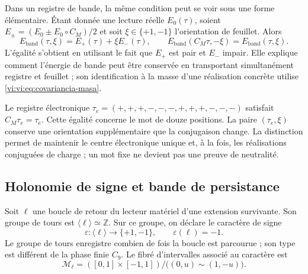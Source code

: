 Dans un registre de bande, la même condition peut se voir sous une forme
élémentaire. Étant donnée une lecture réelle $E_0(\tau)$, soient
$E_\pm=(E_0\pm E_0\circ C_M)/2$ et soit $\xi\in\{+1,-1\}$
l’orientation de feuillet. Alors
\begin{equation}
 E_{\mathrm{band}}(\tau,\xi)=E_+(\tau)+\xi E_-(\tau),\qquad
 E_{\mathrm{band}}(C_M\tau,-\xi)=E_{\mathrm{band}}(\tau,\xi).
 \label{vi:vi:eq:banda-paridad}
\end{equation}
L’égalité s’obtient en utilisant le fait que $E_+$ est pair et $E_-$ impair.
Elle explique comment l’énergie de bande peut être conservée en transportant
simultanément registre et feuillet ; son identification à la masse d’une
réalisation concrète utilise \eqref{vi:vi:eq:covariancia-masa}.

Le registre électronique
$\tau_e=(+,+,+,-,-,-,+,+,+,-,-,-)$ satisfait $C_M\tau_e=\tau_e$.
Cette égalité concerne le mot de douze positions. La paire
$(\tau_e,\xi)$ conserve une orientation supplémentaire que la
conjugaison change. La distinction permet de maintenir le centre
électronique unique et, à la fois, les réalisations conjuguées de charge ;
un mot fixe ne devient pas une preuve de neutralité.

\subsection{Holonomie de signe et bande de persistance}
\label{vi:vi:subsec:mobius}

Soit $\ell$ une boucle de retour du lecteur matériel d’une extension
survivante. Son groupe de tours est $\langle\ell\rangle\simeq
\mathbb Z$. Sur ce groupe, on déclare le caractère de signe
\begin{equation}
 \varepsilon:\langle\ell\rangle\longrightarrow\{+1,-1\},
 \qquad \varepsilon(\ell)=-1.
 \label{vi:vi:eq:holonomia-signo}
\end{equation}
Le groupe de tours enregistre combien de fois la boucle est parcourue ; son
type est différent de la phase finie $C_9$. Le fibré d’intervalles
associé au caractère est
\begin{equation}
 \mathcal M_\ell=([0,1]\times[-1,1])/
                  \bigl((0,u)\sim(1,-u)\bigr).
 \label{vi:vi:eq:banda-mobius}
\end{equation}

